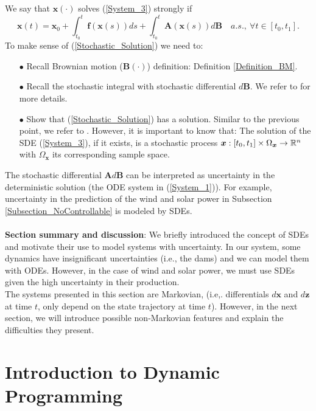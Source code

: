 We say that $\bm{x}(\cdot)$ solves (\ref{System_3}) strongly if
\begin{equation}
\bm{x}(t)=\bm{x}_0+\int_{t_0}^t\bm{f}(\bm{x}(s))ds+\int_{t_0}^t\bm{A}(\bm{x}(s))d\bm{B}\quad a.s.,\ \forall t\in[t_0,t_1].
\label{Stochastic_Solution}
\end{equation}
To make sense of (\ref{Stochastic_Solution})  we need to:
\begin{enumerate}

\item[$\bullet$] Recall Brownian motion ($\bm{B}(\cdot)$) definition: Definition \ref{Definition_BM}.

\item[$\bullet$] Recall the stochastic integral with stochastic differential $d\bm{B}$. We refer to \cite{carlsson2010stochastic} for more details.

\item[$\bullet$] Show that (\ref{Stochastic_Solution}) has a solution. Similar to the previous point, we refer to \cite{carlsson2010stochastic}. However, it is important to know that: The solution of the SDE (\ref{System_3}), if it exists, is a stochastic process $\bm{x}:[t_0,t_1]\times\Omega_{\bm{x}}\to\mathbb{R}^n$ with $\Omega_{\bm{x}}$ its corresponding sample space.

\end{enumerate}

The stochastic differential $\bm{A}d\bm{B}$ can be interpreted as uncertainty in the deterministic solution (the ODE system in (\ref{System_1})). For example, uncertainty
in  the prediction of the wind and solar power in Subsection
\ref{Subsection_NoControllable} is  modeled by SDEs.\\
\\

\textbf{Section summary and discussion}: We briefly introduced the concept of SDEs and motivate their use to model systems with uncertainty. In our system, some dynamics have insignificant uncertainties (i.e., the dams) and we can model them with ODEs. However, in the case of wind and solar power, we must use SDEs given the high uncertainty in their production.\\
The systems presented in this section are Markovian, (i.e,. differentials $d\bm{x}$ and $d\bm{z}$ at time $t$, only depend on the state trajectory at time $t$).  However, in the next section, we will introduce possible non-Markovian features and explain the difficulties they present.

\section{Introduction to Dynamic Programming} \label{Section_DP}

